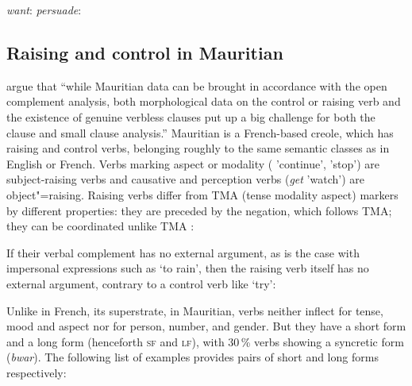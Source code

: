 \documentclass[output=paper
	        ,collection
	        ,collectionchapter
 	        ,biblatex
                ,babelshorthands
                ,newtxmath
                ,draftmode
                ,colorlinks, citecolor=brown
]{langscibook}
\begin{document}
\eal
\ex \emph{want}: 
\ex \emph{persuade}: 
\zl




\subsection{Raising and control in Mauritian}

\citet[]{HenriandLaurens2011} argue that ``while Mauritian data can be brought in accordance with the open complement analysis, both morphological data on the control or raising verb and the existence of genuine verbless clauses put up a big challenge for both the clause and small clause analysis.''
Mauritian is a French-based creole, which has raising and control verbs, belonging roughly to the same semantic classes as in English or French. Verbs marking aspect or
modality ( 'continue',  'stop') are subject-raising verbs and causative and perception verbs (\emph{get} 'watch') are
object"=raising. Raising verbs differ from TMA (tense modality aspect) markers by different properties: they are preceded by
the negation, which follows TMA; they can be coordinated unlike TMA \citep[]{HenriandLaurens2011}:

\eal
{}
\zl
 
If their verbal complement has no external argument, as is the case with impersonal expressions such as  `to rain', then the raising verb itself has no external argument, contrary to a control verb like  `try':

\eal
{}
\zl

Unlike in French, its superstrate, in Mauritian,  verbs neither inflect for tense, mood and aspect nor for person, number, and
gender. But they have a short form and a long form (henceforth \textsc{sf} and \textsc{lf}), with
30\,\% verbs showing a syncretic form (\emph{bwar}). The following list of examples provides pairs of short and
long forms respectively:
\end{document}
